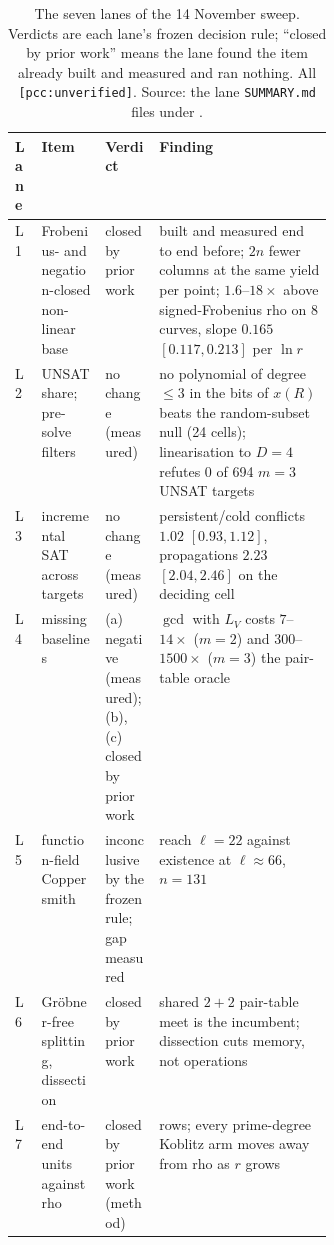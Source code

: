 \begin{table}[t]
\centering\small
\begin{tabularx}{\linewidth}{@{}l>{\raggedright}p{0.2\linewidth}>{\raggedright}p{0.17\linewidth}>{\raggedright\arraybackslash}X@{}}
\toprule
Lane & Item & Verdict & Finding \\
\midrule
L1 & Frobenius- and negation-closed non-linear base & closed by prior work & built and measured end to end before; $2n$ fewer columns at the same yield per point; $1.6$--$18\times$ above signed-Frobenius rho on 8 curves, slope $0.165$ $[0.117,0.213]$ per $\ln r$ \\
L2 & UNSAT share; pre-solve filters & no change (measured) & no polynomial of degree $\le3$ in the bits of $x(R)$ beats the random-subset null (24 cells); linearisation to $D=4$ refutes 0 of 694 $m=3$ UNSAT targets \\
L3 & incremental SAT across targets & no change (measured) & persistent/cold conflicts $1.02$ $[0.93,1.12]$, propagations $2.23$ $[2.04,2.46]$ on the deciding cell \\
L4 & missing baselines & (a) negative (measured); (b), (c) closed by prior work & $\gcd$ with $L_V$ costs $7$--$14\times$ ($m=2$) and $300$--$1500\times$ ($m=3$) the pair-table oracle \\
L5 & function-field Coppersmith & inconclusive by the frozen rule; gap measured & reach $\ell=22$ against existence at $\ell\approx66$, $n=131$ \\
L6 & Gr\"obner-free splitting, dissection & closed by prior work & shared $2+2$ pair-table meet is the incumbent; dissection cuts memory, not operations \\
L7 & end-to-end units against rho & closed by prior work (method) & 147 rows; every prime-degree Koblitz arm moves away from rho as $r$ grows \\
\bottomrule
\end{tabularx}
\caption[]{The seven lanes of the 14 November sweep. Verdicts are each
lane's frozen decision rule; ``closed by prior work'' means the lane found
the item already built and measured and ran nothing. All
\texttt{[pcc:unverified]}. Source: the lane \texttt{SUMMARY.md} files under
.}
\label{tab:bt-open7}
\end{table}


